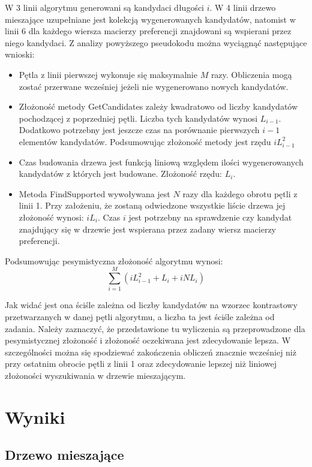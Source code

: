 \documentclass[a4paper,12pt]{article}
\begin{document}
W 3 linii algorytmu generowani są kandydaci długości $i$. W 4 linii drzewo mieszające uzupełniane jest kolekcją wygenerowanych kandydatów, natomist w linii 6 dla każdego wiersza macierzy preferencji znajdowani są wspierani przez niego kandydaci.
Z analizy powyższego pseudokodu można wyciągnąć następujące wnioski:
\begin{itemize}
\item Pętla z linii pierwszej wykonuje się maksymalnie $M$ razy. Obliczenia mogą zostać przerwane wcześniej jeżeli nie wygenerowano nowych kandydatów.
\item Złożoność metody GetCandidates zależy kwadratowo od liczby kandydatów pochodzącej z poprzedniej pętli. Liczba tych kandydatów wynosi $L_{i-1}$. Dodatkowo potrzebny jest jeszcze czas na porównanie pierwszych $i-1$ elementów kandydatów. Podsumowując złożoność metody jest rzędu $iL_{i-1}^2$
\item Czas budowania drzewa jest funkcją liniową względem ilości wygenerowanych kandydatów z których jest budowane. Złożoność rzędu: $L_i$.
\item Metoda FindSupported wywoływana jest $N$ razy dla każdego obrotu pętli z linii 1.  Przy założeniu, że zostaną odwiedzone wszystkie liście drzewa jej złożoność wynosi: $iL_i$. Czas $i$ jest potrzebny na sprawdzenie czy kandydat znajdujący się w drzewie jest wspierana przez zadany wiersz macierzy preferencji.
\end{itemize}

Podsumowując pesymistyczna złożoność algorytmu wynosi:
$$ \sum_{i=1}^M (iL_{i-1}^2 + L_i + iNL_i) $$

Jak widać jest ona ściśle zależna od liczby kandydatów na wzorzec kontrastowy przetwarzanych w danej pętli algorytmu, a liczba ta jest ściśle zależna od zadania. Należy zaznaczyć, że przedstawione tu wyliczenia są przeprowadzone dla pesymistycznej złożoność i złożoność oczekiwana jest zdecydowanie lepsza. W szczególności można się spodziewać zakończenia obliczeń znacznie wcześniej niż przy ostatnim obrocie pętli z linii 1 oraz zdecydowanie lepszej niż liniowej złożoności wyszukiwania w drzewie mieszającym.


\section{Wyniki}

\subsection{Drzewo mieszające}
\end{document}
